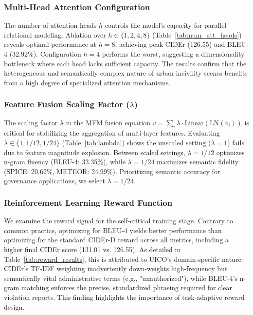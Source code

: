 \documentclass[lettersize,journal]{IEEEtran}
\begin{document}
	\subsubsection{Multi-Head Attention Configuration}
	
	The number of attention heads \(h\) controls the model's capacity for parallel relational modeling. Ablation over \(h \in \{1, 2, 4, 8\}\) (Table~\ref{tab:num_att_heads}) reveals optimal performance at \(h=8\), achieving peak CIDEr (126.55) and BLEU-4 (32.92\%). Configuration \(h=4\) performs the worst, suggesting a dimensionality bottleneck where each head lacks sufficient capacity. The results confirm that the heterogeneous and semantically complex nature of urban incivility scenes benefits from a high degree of specialized attention mechanisms.
	
	\subsubsection{Feature Fusion Scaling Factor (\(\lambda\))}
	
	The scaling factor \(\lambda\) in the MFM fusion equation \(v=\sum_{i}\lambda \cdot \text{Linear}(\text{LN}(v_i))\) is critical for stabilizing the aggregation of multi-layer features. Evaluating \(\lambda \in \{1, 1/12, 1/24\}\) (Table~\ref{tab:lambda}) shows the unscaled setting (\(\lambda=1\)) fails due to feature magnitude explosion. Between scaled settings, \(\lambda=1/12\) optimizes n-gram fluency (BLEU-4: 33.35\%), while \(\lambda=1/24\) maximizes semantic fidelity (SPICE: 20.62\%, METEOR: 24.99\%). Prioritizing semantic accuracy for governance applications, we select \(\lambda=1/24\).
	
	\subsubsection{Reinforcement Learning Reward Function}
	
	We examine the reward signal for the self-critical training stage. Contrary to common practice, optimizing for BLEU-4 yields better performance than optimizing for the standard CIDEr-D reward across all metrics, including a higher final CIDEr score (131.01 vs. 126.55). As detailed in Table~\ref{tab:reward_results}, this is attributed to UICO's domain-specific nature: CIDEr's TF-IDF weighting inadvertently down-weights high-frequency but semantically vital administrative terms (e.g., "unauthorized"), while BLEU-4's n-gram matching enforces the precise, standardized phrasing required for clear violation reports. This finding highlights the importance of task-adaptive reward design.
	
\end{document}
